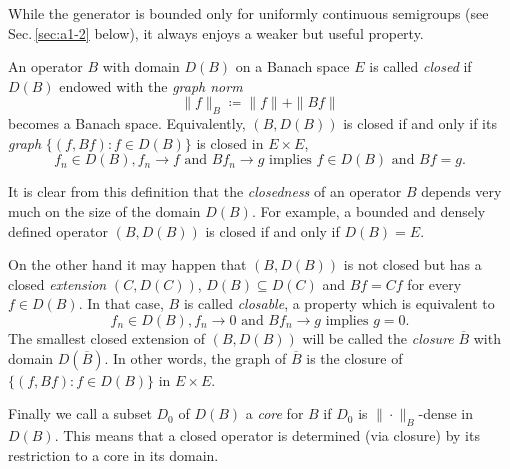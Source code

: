 While the generator is bounded only for uniformly continuous semigroups (see Sec.\,\ref{sec:a1-2} below), it always enjoys a weaker but useful property.
\begin{definition}\label{def:a1-1.8}
An operator $B$ with domain $D(B)$ on a Banach space $E$ is called \emph{closed} if $D(B)$ endowed with the \emph{graph norm}
\[
    \|f\|_{B} \coloneqq \|f\| + \|Bf\|
\]
becomes a Banach space.
Equivalently, $(B,D(B))$ is closed if and only if its \emph{graph} $\{(f,Bf) \colon f \in D(B)\}$ is closed in $E \times E$, \ie
\[
    f_{n} \in D(B), f_{n} \to f \text{ and } Bf_{n} \to g \text{ implies } f \in D(B) \text{ and } Bf = g.
\]
\end{definition}
It is clear from this definition that the \emph{closedness} of an operator $B$ depends very much on the size of the domain $D(B)$.
For example, a bounded and densely defined operator $(B,D(B))$ is closed if and only if $D(B) = E$.

On the other hand it may happen that $(B,D(B))$ is not closed but has a closed \emph{extension} $(C,D(C))$, \ie  $ D(B) \subseteq D(C)$ and $Bf = Cf$ for every $f \in D(B)$.
In that case, $B$ is called \emph{closable}, a property which is equivalent to
\[
    f_{n} \in D(B), f_{n} \to 0 \text{ and } Bf_{n} \to g \text{ implies } g = 0.
\]
The smallest closed extension of $(B,D(B))$ will be called the \emph{closure} $\overline{B}$ with domain $D(\overline{B})$.
In other words, the graph of $\overline{B}$ is the closure of $\{(f,Bf) \colon f \in D(B)\}$ in $E \times E$.

Finally we call a subset $D_{0}$ of $D(B)$ a \emph{core} for $B$ if $D_{0}$ is $\|\cdot\|_{B}$-dense in $D(B)$.
This means that a closed operator is determined (via closure) by its restriction to a core in its domain.

